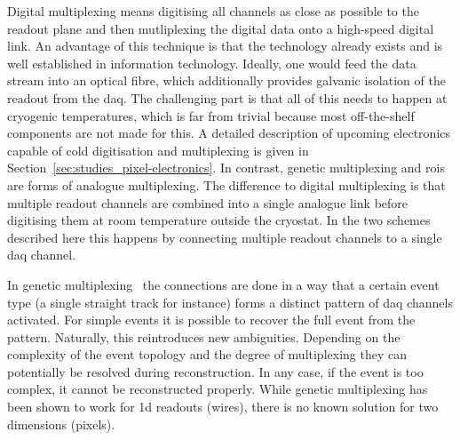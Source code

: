 Digital multiplexing means digitising all channels as close as possible to the readout plane and then mutliplexing the digital data onto a high-speed digital link.
An advantage of this technique is that the technology already exists and is well established in information technology.
Ideally, one would feed the data stream into an optical fibre, which additionally provides galvanic isolation of the readout from the \gls{daq}.
The challenging part is that all of this needs to happen at cryogenic temperatures, which is far from trivial because most off-the-shelf components are not made for this.
A detailed description of upcoming electronics capable of cold digitisation and multiplexing is given in Section~\ref{sec:studies_pixel-electronics}.
In contrast, genetic multiplexing and \glspl{roi} are forms of analogue multiplexing.
The difference to digital multiplexing is that multiple readout channels are combined into a single analogue link before digitising them at room temperature outside the cryostat.
In the two schemes described here this happens by connecting multiple readout channels to a single \gls{daq} channel.

In genetic multiplexing~\cite{gen_mux} the connections are done in a way that a certain event type (a single straight track for instance) forms a distinct pattern of \gls{daq} channels activated.
For simple events it is possible to recover the full event from the pattern.
Naturally, this reintroduces new ambiguities.
Depending on the complexity of the event topology and the degree of multiplexing they can potentially be resolved during reconstruction.
In any case, if the event is too complex, it cannot be reconstructed properly.
While genetic multiplexing has been shown to work for \gls{1d} readouts (wires), there is no known solution for two dimensions (pixels).


